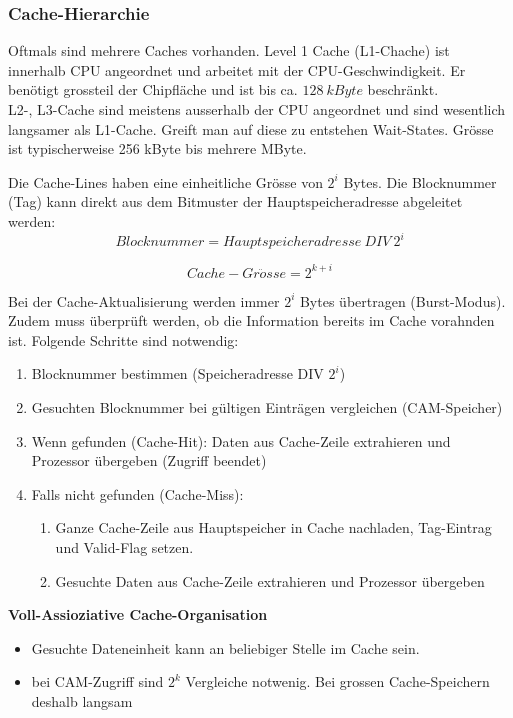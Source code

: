 \subsubsection{Cache-Hierarchie}
Oftmals sind mehrere Caches vorhanden. Level 1 Cache (L1-Chache) ist innerhalb CPU angeordnet und arbeitet mit der CPU-Geschwindigkeit.
Er benötigt grossteil der Chipfläche und ist bis ca. $128 \ kByte$ beschränkt.\\
L2-, L3-Cache sind meistens ausserhalb der CPU angeordnet und sind wesentlich langsamer als L1-Cache.
Greift man auf diese zu entstehen Wait-States. Grösse ist typischerweise 256 kByte bis mehrere MByte. \newline 

Die Cache-Lines haben eine einheitliche Grösse von $2^i$ Bytes.
Die Blocknummer (Tag) kann direkt aus dem Bitmuster der Hauptspeicheradresse abgeleitet werden:
\begin{equation*}
	Blocknummer = Hauptspeicheradresse \ DIV \ 2^i
\end{equation*}

\begin{equation*}
	Cache-Gr\ddot{o}sse = 2^{k+i}
\end{equation*}

Bei der Cache-Aktualisierung werden immer $2^i$ Bytes übertragen (Burst-Modus).
Zudem muss überprüft werden, ob die Information bereits im Cache vorahnden ist.
Folgende Schritte sind notwendig:
\begin{enumerate}[noitemsep,topsep=0pt]
	\item Blocknummer bestimmen (Speicheradresse DIV $2^i$)
	\item Gesuchten Blocknummer bei gültigen Einträgen vergleichen (CAM-Speicher)
	\item Wenn gefunden (Cache-Hit): Daten aus Cache-Zeile extrahieren und Prozessor übergeben (Zugriff beendet)
	\item Falls nicht gefunden (Cache-Miss):
	\begin{enumerate}[noitemsep,topsep=0pt]
		\item Ganze Cache-Zeile aus Hauptspeicher in Cache nachladen, Tag-Eintrag und Valid-Flag setzen.
		\item Gesuchte Daten aus Cache-Zeile extrahieren und Prozessor übergeben
	\end{enumerate}
\end{enumerate}

	\textbf{Voll-Assioziative Cache-Organisation}
	\begin{itemize}[noitemsep,topsep=0pt]
		\item Gesuchte Dateneinheit kann an beliebiger Stelle im Cache sein.
		\item bei CAM-Zugriff sind $2 ^k$ Vergleiche notwenig. Bei grossen Cache-Speichern deshalb langsam
	\end{itemize}

